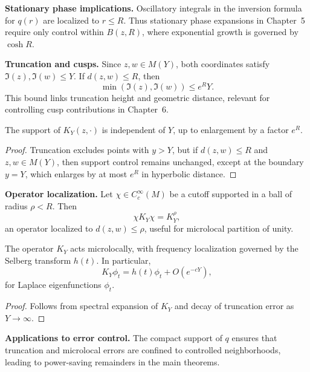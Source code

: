 \medskip

\noindent\textbf{Stationary phase implications.}
Oscillatory integrals in the inversion formula for $q(r)$
are localized to $r\le R$.
Thus stationary phase expansions in Chapter~5
require only control within $B(z,R)$,
where exponential growth is governed by $\cosh R$.

\medskip

\noindent\textbf{Truncation and cusps.}
Since $z,w\in M(Y)$, both coordinates satisfy $\Im(z),\Im(w)\le Y$.
If $d(z,w)\le R$, then
\[
  \min(\Im(z),\Im(w)) \le e^{R}Y.
\]
This bound links truncation height and geometric distance,
relevant for controlling cusp contributions in Chapter~6.

\medskip

\begin{lemma}\label{lem:support-stability}
The support of $K_{Y}(z,\cdot)$ is independent of $Y$,
up to enlargement by a factor $e^{R}$.
\end{lemma}

\begin{proof}
Truncation excludes points with $y>Y$,
but if $d(z,w)\le R$ and $z,w\in M(Y)$,
then support control remains unchanged,
except at the boundary $y=Y$,
which enlarges by at most $e^{R}$ in hyperbolic distance.
\end{proof}

\medskip

\noindent\textbf{Operator localization.}
Let $\chi\in C_{c}^{\infty}(M)$ be a cutoff supported in a ball of radius $\rho<R$.
Then
\[
  \chi K_{Y}\chi = K_{Y}^{\rho},
\]
an operator localized to $d(z,w)\le \rho$,
useful for microlocal partition of unity.

\medskip

\begin{lemma}\label{lem:microlocal}
The operator $K_{Y}$ acts microlocally,
with frequency localization governed by the Selberg transform $h(t)$.
In particular,
\[
  K_{Y}\phi_{t} = h(t)\phi_{t} + O(e^{-cY}),
\]
for Laplace eigenfunctions $\phi_{t}$.
\end{lemma}

\begin{proof}
Follows from spectral expansion of $K_{Y}$
and decay of truncation error as $Y\to\infty$.
\end{proof}

\medskip

\noindent\textbf{Applications to error control.}
The compact support of $q$ ensures that truncation and microlocal errors
are confined to controlled neighborhoods,
leading to power-saving remainders in the main theorems.

